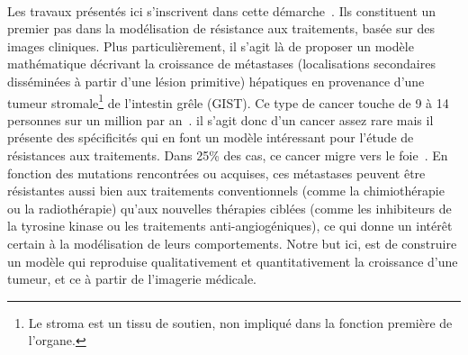 \documentclass[main.tex]{subfiles}
\begin{document}
\paragraph{}
Les travaux présentés ici s'inscrivent dans cette démarche~\cite{cornelis2013vivo,jouganous2014}. Ils constituent un premier pas dans la modélisation de résistance aux traitements, basée sur des images cliniques. 
Plus particulièrement, il s'agit là de proposer un modèle mathématique décrivant la croissance de métastases 
(localisations secondaires disséminées à partir d'une lésion primitive)
hépatiques en provenance d'une  
tumeur stromale\footnote{Le stroma est un tissu de soutien, non impliqué dans la fonction première de l'organe.} de l'intestin grêle
(GIST).
Ce type de cancer touche de 9 à 14 personnes sur un million par an~\cite{Nilsson2005}. 
il s'agit donc d'un cancer assez rare mais il présente des spécificités qui en font un modèle intéressant pour l'étude de résistances aux traitements. 
Dans 25\% des cas, ce cancer migre vers le foie~\cite{dematteo2000}. 
En fonction des mutations rencontrées ou acquises, ces métastases peuvent être résistantes aussi bien aux traitements conventionnels (comme la chimiothérapie ou la radiothérapie) qu'aux nouvelles thérapies ciblées (comme les inhibiteurs de la tyrosine kinase ou les traitements anti-angiogéniques), ce qui donne un intérêt certain à la modélisation de leurs comportements. 
Notre but ici, est de construire un modèle qui reproduise qualitativement et quantitativement la croissance d'une tumeur, et ce à partir de l'imagerie médicale.
\end{document}
